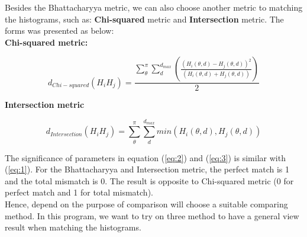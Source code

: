 Besides the Bhattacharyya metric, we can also choose another metric to matching the histograms, such as: \textbf{Chi-squared} metric and \textbf{Intersection} metric. The forms was presented as below:\\
\textbf{Chi-squared metric:}
\begin{center}
\begin{equation}\label{eq:2}
d_{Chi-squared} (H_{i}H_{j}) = \frac{\sum\limits_{\theta}^{\pi}\sum\limits_{d}^{d_{max}}(\frac{(H_{i}(\theta,d) - H_{j}(\theta,d))^{2}}{(H_{i}(\theta,d) + H_{j}(\theta,d))})}{2}
\end{equation}
\end{center}
\textbf{Intersection metric}
\begin{center}
\begin{equation}\label{eq:3}
d_{Intersection} (H_{i}H_{j}) = \sum\limits_{\theta}^{\pi}\sum\limits_{d}^{d_{max}}min(H_{i}(\theta,d), H_{j}(\theta,d))
\end{equation}
\end{center}
The significance of parameters in equation (\ref{eq:2}) and (\ref{eq:3}) is similar with (\ref{eq:1}). For the Bhattacharyya and Intersection metric, the perfect match is 1 and the total mismatch is 0. The result is opposite to Chi-squared metric (0 for perfect match and 1 for total mismatch).\\[0.2cm]
Hence, depend on the purpose of comparison will choose a suitable comparing method. In this program, we want to try on three method to have a general view result when matching the histograms.
